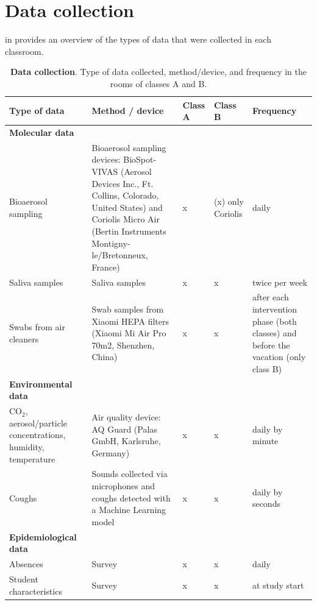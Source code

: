 \documentclass[fleqn,11pt]{wlscirep_supp}
\begin{document}

\newpage

\section{Data collection}\label{sec:data-collection}

 in \supp provides an overview of the types of data that were collected in each classroom.

\begin{table}[!htpb]
    \footnotesize
    \centering
    \caption{\textbf{Data collection}. Type of data collected, method/device, and frequency in the rooms of classes A and B.}
    \begin{tabular}{p{3.5cm}p{6cm} p{1cm} p{1cm} p{3cm}}
    \midrule
    Type of data & Method / device & Class A & Class B & Frequency \\
    \midrule
    \textbf{Molecular data} \\
    \midrule
    Bioaerosol sampling & Bioaerosol sampling devices: BioSpot-VIVAS (Aerosol Devices Inc., Ft. Collins, Colorado, United States) and Coriolis Micro Air (Bertin Instruments Montigny-le/Bretonneux, France) & x & (x) \newline only Coriolis & daily \\
    Saliva samples & Saliva samples & x & x & twice per week \\
    Swabs from air cleaners & Swab samples from Xiaomi HEPA filters (Xiaomi Mi Air Pro 70m2, Shenzhen, China) & x & x & after each intervention phase (both classes) and before the vacation (only class B) \\ 
    \midrule
    \textbf{Environmental data} \\
    \midrule
    CO$_2$, aerosol/particle concentrations, humidity, temperature & Air quality device: AQ Guard (Palas GmbH, Karlsruhe, Germany) & x & x & daily by minute \\
    Coughs & Sounds collected via microphones and coughs detected with a Machine Learning model \cite{Bertschinger2023CBMS} & x & x & daily by seconds \\
    \midrule
    \textbf{Epidemiological data} \\
    \midrule
    Absences & Survey & x & x & daily \\
    Student characteristics & Survey & x & x & at study start \\
    \bottomrule
    \end{tabular}
    \label{tab:data}
\end{table}
\end{document}
